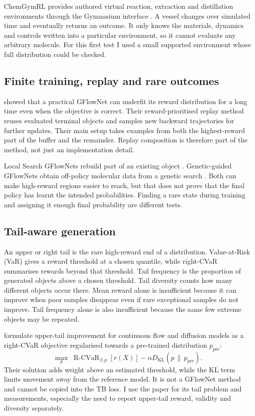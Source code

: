 \documentclass{article}
\begin{document}
ChemGymRL provides authored virtual reaction, extraction and distillation environments through the Gymnasium interface \citep{beeler2024chemgymrl}. A vessel changes over simulated time and eventually returns an outcome. It only knows the materials, dynamics and controls written into a particular environment, so it cannot evaluate any arbitrary molecule. For this first test I used a small supported environment whose full distribution could be checked.

\subsection{Finite training, replay and rare outcomes}

\citet{shen2023training} showed that a practical GFlowNet can underfit its reward distribution for a long time even when the objective is correct. Their reward-prioritised replay method reuses evaluated terminal objects and samples new backward trajectories for further updates. Their main setup takes examples from both the highest-reward part of the buffer and the remainder. Replay composition is therefore part of the method, not just an implementation detail.

Local Search GFlowNets rebuild part of an existing object \citep{kim2024local}. Genetic-guided GFlowNets obtain off-policy molecular data from a genetic search \citep{kim2024genetic}. Both can make high-reward regions easier to reach, but that does not prove that the final policy has learnt the intended probabilities. Finding a rare state during training and assigning it enough final probability are different tests.

\subsection{Tail-aware generation}

An upper or right tail is the rare high-reward end of a distribution. Value-at-Risk (VaR) gives a reward threshold at a chosen quantile, while right-CVaR summarises rewards beyond that threshold. Tail frequency is the proportion of generated objects above a chosen threshold. Tail diversity counts how many different objects occur there. Mean reward alone is insufficient because it can improve when poor samples disappear even if rare exceptional samples do not improve. Tail frequency alone is also insufficient because the same few extreme objects may be repeated.

\citet{wang2026tail} formulate upper-tail improvement for continuous flow and diffusion models as a right-CVaR objective regularised towards a pre-trained distribution $p_{\mathrm{pre}}$:
\begin{equation}
\max_p \; \operatorname{R\text{-}CVaR}_{\beta,p}[r(X)]
-\alpha D_{\mathrm{KL}}\!\left(p\,\|\,p_{\mathrm{pre}}\right).
\end{equation}
Their solution adds weight above an estimated threshold, while the KL term limits movement away from the reference model. It is not a GFlowNet method and cannot be copied into the TB loss. I use the paper for its tail problem and measurements, especially the need to report upper-tail reward, validity and diversity separately.
\end{document}
